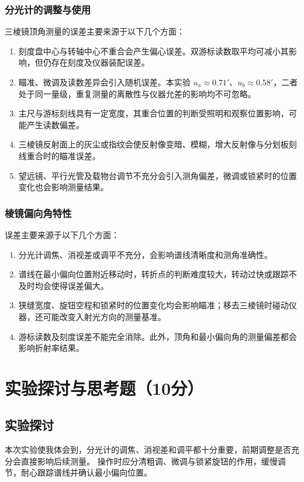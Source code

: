 \documentclass[10pt,a4paper]{ctexart} %
\begin{document}
    \subsubsection{分光计的调整与使用}
    三棱镜顶角测量的误差主要来源于以下几个方面：
    \begin{enumerate}
      \item 刻度盘中心与转轴中心不重合会产生偏心误差。双游标读数取平均可减小其影响，但仍存在刻度及仪器装配误差。
      \item 瞄准、微调及读数差异会引入随机误差。本实验 $u_a\approx0.71'$、$u_b\approx0.58'$，二者处于同一量级，重复测量的离散性与仪器允差的影响均不可忽略。
      \item 主尺与游标刻线具有一定宽度，其重合位置的判断受照明和观察位置影响，可能产生读数偏差。
      \item 三棱镜反射面上的灰尘或指纹会使反射像变暗、模糊，增大反射像与分划板刻线重合时的瞄准误差。
      \item 望远镜、平行光管及载物台调节不充分会引入测角偏差，微调或锁紧时的位置变化也会影响测量结果。
    \end{enumerate}

    \subsubsection{棱镜偏向角特性}
    误差主要来源于以下几个方面：
    \begin{enumerate}
      \item 分光计调焦、消视差或调平不充分，会影响谱线清晰度和测角准确性。
      \item 谱线在最小偏向位置附近移动时，转折点的判断难度较大，转动过快或跟踪不及时均会使得误差偏大。
      \item 狭缝宽度、旋钮空程和锁紧时的位置变化均会影响瞄准；移去三棱镜时碰动仪器，还可能改变入射光方向的测量基准。
      \item 游标读数及刻度误差不能完全消除。此外，顶角和最小偏向角的测量偏差都会影响折射率结果。
    \end{enumerate}

\section{实验探讨与思考题（10分）}

  \subsection{实验探讨}

    本次实验使我体会到，分光计的调焦、消视差和调平都十分重要，前期调整是否充分会直接影响后续测量。
    操作时应分清粗调、微调与锁紧旋钮的作用，缓慢调节，耐心跟踪谱线并确认最小偏向位置。
\end{document}
